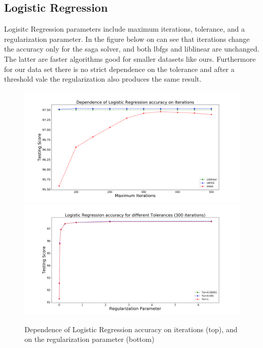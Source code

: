\subsection{Logistic Regression}

Logisitc Regression parameters include maximum iterations, tolerance, and a regularization parameter. In the figure below on can see that iterations change the accuracy only for the saga solver, and both lbfgs and liblinear are unchanged. The latter are faster algorithms good for smaller datasets like ours. Furthermore for our data set there is no strict dependence on the tolerance and after a threshold vale the regularization also produces the same result.\\

\begin{figure}[h]
\includegraphics[width=\twopicsp\textwidth]{plots/solver.pdf}
\includegraphics[width=\twopicsp\textwidth]{plots/tol.png}
\caption{Dependence of Logistic Regression accuracy on iterations (top), and on the regularization parameter (bottom)	}
\label{fig:Maps_data}
\end{figure}

